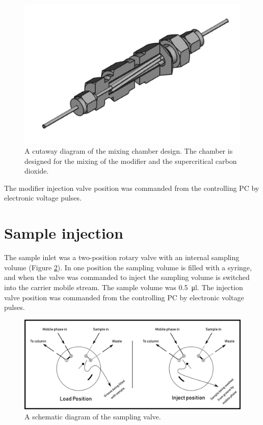 \begin{figure}
\centering
\includegraphics[width=\textwidth]{Figures/MixingChamber.png}
\decoRule

\caption[A cutaway diagram of the mixing chamber]{A cutaway diagram of the
mixing chamber design. The chamber is designed for the mixing of the modifier
and the supercritical carbon dioxide.}

\label{fig:mixingchamber}
\end{figure}

The modifier injection valve position was commanded from the controlling PC by electronic
voltage pulses.

\section{Sample injection}
\label{sec:SFCInjection}

The sample inlet was a two-position rotary valve with an internal sampling
volume (Figure \ref{fig:samplingvalve}). In one position the sampling volume is
filled with a syringe, and when the valve was commanded to inject the sampling
volume is switched into the carrier mobile stream. The sample volume was
\SI{0.5}{\micro\litre}. The injection valve position was commanded from the
controlling PC by electronic voltage pulses.

\begin{figure}
\centering
\includegraphics[width=\textwidth]{Figures/SampleValve.pdf}
\decoRule

\caption[Schematic diagram of the injection valve.]{A schematic diagram of the sampling valve. }

\label{fig:samplingvalve}
\end{figure}

